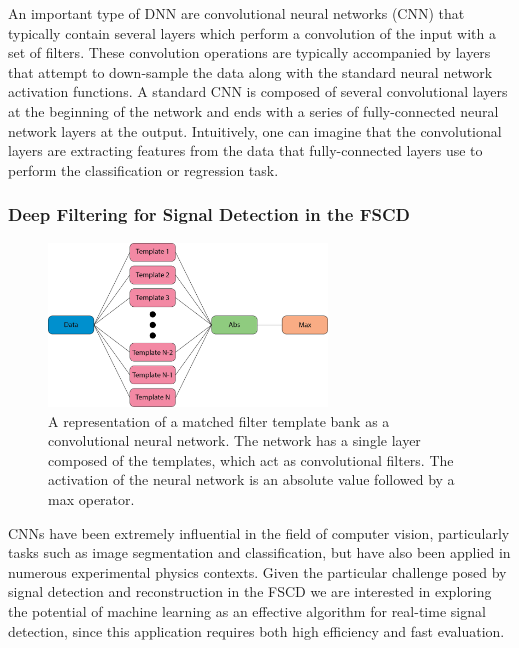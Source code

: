 An important type of DNN are convolutional neural networks (CNN) that typically contain several layers which perform a convolution of the input with a set of filters. These convolution operations are typically accompanied by layers that attempt to down-sample the data along with the standard neural network activation functions. A standard CNN is composed of several convolutional layers at the beginning of the network and ends with a series of fully-connected neural network layers at the output. Intuitively, one can imagine that the convolutional layers are extracting features from the data that fully-connected layers use to perform the classification or regression task.

\subsubsection*{Deep Filtering for Signal Detection in the FSCD}

\begin{figure}[htbp]
    \centering
    \includegraphics[width=0.66\textwidth]{figs/Chapter-4/230517_mf_conv_net.png}
    \caption{A representation of a matched filter template bank as a convolutional neural network. The network has a single layer composed of the templates, which act as convolutional filters. The activation of the neural network is an absolute value followed by a max operator.}
    \label{fig:chap4-mf-neural-network}
\end{figure}

CNNs have been extremely influential in the field of computer vision, particularly tasks such as image segmentation and classification, but have also been applied in numerous experimental physics contexts. Given the particular challenge posed by signal detection and reconstruction in the FSCD we are interested in exploring the potential of machine learning as an effective algorithm for real-time signal detection, since this application requires both high efficiency and fast evaluation.

